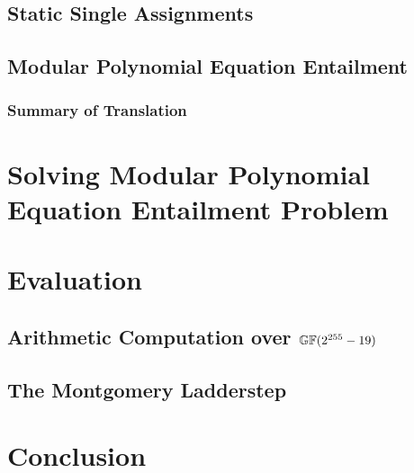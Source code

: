 \documentclass{llncs}
\begin{document}
\subsection{Static Single Assignments}
\label{subsection:translation:static-single-assignment}



\subsection{Modular Polynomial Equation Entailment}
\label{subsection:translation:multivariant-polynomial-equations}


\subsubsection*{Summary of Translation}



\section{Solving Modular Polynomial Equation Entailment Problem}
\label{section:solving-algebraic-equations}


\section{Evaluation}
\label{section:evaluation}


\subsection{Arithmetic Computation over $\mathbb{GF}(2^{255}-19)$}
\label{subection:evaluation:multiplication}


\subsection{The Montgomery Ladderstep}
\label{subsection:evaluation:ladder-step}


\section{Conclusion}
\label{section:conclusion}





\end{document}
